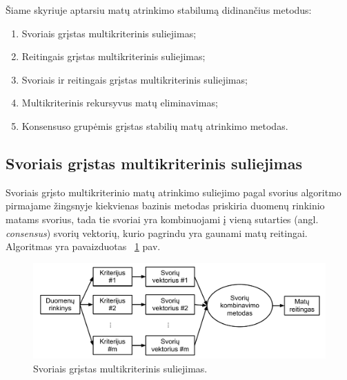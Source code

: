 Šiame skyriuje aptarsiu matų atrinkimo stabilumą didinančius metodus:
\begin{enumerate}
 \item Svoriais grįstas multikriterinis suliejimas;
 \item Reitingais grįstas multikriterinis suliejimas;
 \item Svoriais ir reitingais grįstas multikriterinis suliejimas;
 \item Multikriterinis rekursyvus matų eliminavimas;
 \item Konsensuso grupėmis grįstas stabilių matų atrinkimo metodas.
\end{enumerate}

\subsection{Svoriais grįstas multikriterinis suliejimas}

Svoriais grįsto multikriterinio matų atrinkimo suliejimo pagal svorius algoritmo pirmajame žingsnyje kiekvienas bazinis metodas priskiria duomenų rinkinio matams svorius, tada tie svoriai yra kombinuojami į vieną sutarties (angl. \textit{consensus}) svorių vektorių, kurio pagrindu yra gaunami matų reitingai. Algoritmas yra pavaizduotas ~\ref{fig:figure4} pav.
\begin{figure}
 \centering
 \includegraphics[width=1\textwidth]{images/score_based_fusion.pdf}
 \caption{Svoriais grįstas multikriterinis suliejimas.}
 \label{fig:figure4}
\end{figure}

